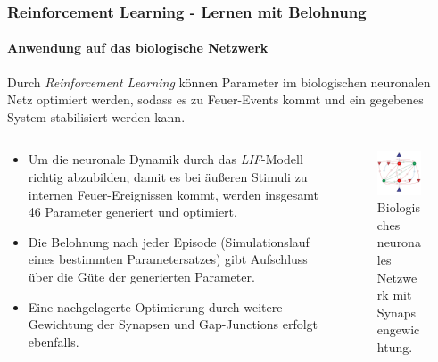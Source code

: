 \documentclass[10pt,t,aspectratio=1610]{beamer}
\newcommand{\ChapterRl}{Reinforcement Learning - Lernen mit Belohnung}
\begin{document}
\begin{frame}
	\frametitle{\ChapterRl}
	\framesubtitle{Anwendung auf das biologische Netzwerk}
	\vspace{0.3cm}
	Durch \textit{Reinforcement Learning} können Parameter im biologischen neuronalen Netz optimiert werden, sodass es zu Feuer-Events kommt und ein gegebenes System stabilisiert werden kann.
	\vspace{0.2cm}
	\begin{columns}[T,onlytextwidth]
		\begin{column}{0.5\textwidth}
			\begin{itemize}
				\item Um die neuronale Dynamik durch das \textit{LIF}-Modell richtig abzubilden, damit es bei äußeren Stimuli zu internen Feuer-Ereignissen kommt, werden insgesamt 46 Parameter generiert und optimiert.
				\item Die Belohnung nach jeder Episode (Simulationslauf eines bestimmten Parametersatzes) gibt Aufschluss über die Güte der generierten Parameter.
				\item Eine nachgelagerte Optimierung durch weitere Gewichtung der Synapsen und Gap-Junctions erfolgt ebenfalls.
			\end{itemize}
		\end{column}
		\hspace{1cm}
		\begin{column}{0.45\textwidth}
			\vspace{-0.5cm}
			\begin{figure}[H] %
				\centering
				\includegraphics[width=5cm]{figures/Neural_Net_v3_num_syn.pdf}
				\caption{Biologisches neuronales Netzwerk mit Synapsengewichtung.}
				\label{fig:bnn_num}
			\end{figure}
		\end{column}
	\end{columns}
\end{frame}

\end{document}
